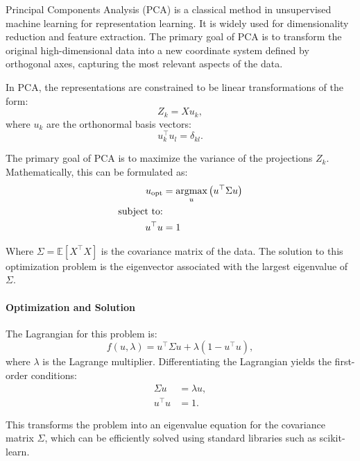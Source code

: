 Principal Components Analysis (PCA)\citep{hotelling1933analysis} is a classical method in unsupervised machine learning for representation learning.
It is widely used for dimensionality reduction and feature extraction.
The primary goal of PCA is to transform the original high-dimensional data into a new coordinate system defined by orthogonal axes, capturing the most relevant aspects of the data.

In PCA, the representations are constrained to be linear transformations of the form:
\begin{equation}\label{eq:pca-linear-function-def}
    Z_k = X u_k,
\end{equation}
where $u_k$ are the orthonormal basis vectors:
\begin{equation}\label{eq:pca-orthonormality-constraint}
    u_k^\top u_l = \delta_{kl}.
\end{equation}

The primary goal of PCA is to maximize the variance of the projections \(Z_k\). Mathematically, this can be formulated
as:
\begin{align}
    u_{\text{opt}} &= \underset{u}{\text{argmax}} \left( u^\top \Sigma u \right) \\
    \text{subject to:} \notag \\
    u^\top u &= 1 \notag
\end{align}

Where \(\Sigma = \mathbb{E}[X^\top X]\) is the covariance matrix of the data. The solution to this optimization problem is the eigenvector associated with the largest eigenvalue of \(\Sigma\).

\paragraph{Optimization and Solution}
The Lagrangian for this problem is:
\begin{equation}
    f(u,\lambda) = u^\top \Sigma u + \lambda(1 - u^\top u),
\end{equation}
where \(\lambda\) is the Lagrange multiplier. Differentiating the Lagrangian yields the first-order conditions:
\begin{align}
    \Sigma u &= \lambda u, \\
    u^\top u &= 1.
\end{align}

This transforms the problem into an eigenvalue equation for the covariance matrix \(\Sigma\), which can be efficiently solved using standard libraries such as scikit-learn\citep{pedregosa2011scikit}.

